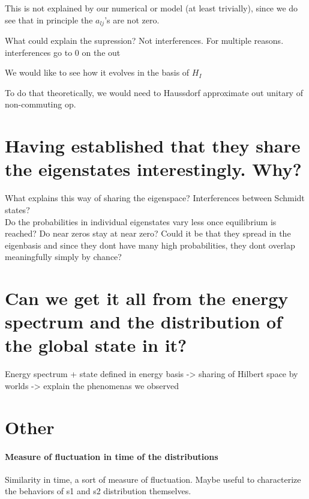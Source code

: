 \documentclass{article}
\begin{document}
This is not explained by our numerical or model (at least trivially), since we do see that in principle the $a_{lj}$'s are not zero.

What could explain the supression? Not interferences. For multiple reasons. interferences go to 0 on the out


We would like to see how it evolves in the basis of $H_I$

To do that theoretically, we would need to Haussdorf approximate out unitary of non-commuting op.


\newpage


\section{Having established that they share the eigenstates interestingly. Why?}
 

What explains this way of sharing the eigenspace? Interferences between Schmidt states? \\

{\color{teal} Do the probabilities in individual eigenstates vary less once equilibrium is reached? Do near zeros stay at near zero? Could it be that they spread in the eigenbasis and since they dont have many high probabilities, they dont overlap meaningfully simply by chance?}

\section{Can we get it all from the energy spectrum and the distribution of the global state in it?}

Energy spectrum + state defined in energy basis -> sharing of Hilbert space by worlds -> explain the phenomenas we observed




\section{Other}


\paragraph{Measure of fluctuation in time of the distributions}
Similarity in time, a sort of measure of fluctuation. Maybe useful to characterize the behaviors of s1 and s2 distribution themselves.\\
\end{document}
